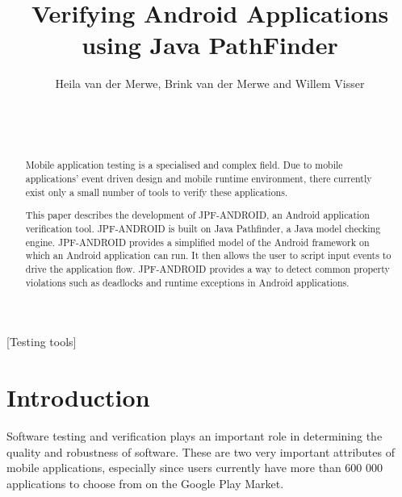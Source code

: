 \documentclass{acm_proc_article-sp}
\begin{document}
\title{Verifying Android Applications using Java PathFinder}


\author{%
\alignauthor Heila van der Merwe, Brink van der Merwe and Willem Visser\\
       \\
       \\
       \\
}

\maketitle

\begin{abstract}
Mobile application testing is a specialised and complex field. Due to mobile applications' event driven design and mobile runtime
environment, there currently exist only a small number of tools to verify these applications.

This paper describes the development of JPF-ANDROID, an Android application verification tool. JPF-ANDROID is built on Java Pathfinder, 
a Java model checking engine. JPF-ANDROID provides a simplified model of the Android framework on which an Android application can run. It then allows
the user to script input events to drive the \linebreak application flow. JPF-ANDROID provides a way to detect common property violations such as deadlocks and runtime exceptions
in Android applications.
\end{abstract}

[Testing tools]



\section{Introduction}
Software testing and verification plays an important role in determining the quality and robustness of software. These are two very
important attributes of mobile applications, especially since users currently have more than 600 000 applications to choose from on the
Google Play Market.
\end{document}
